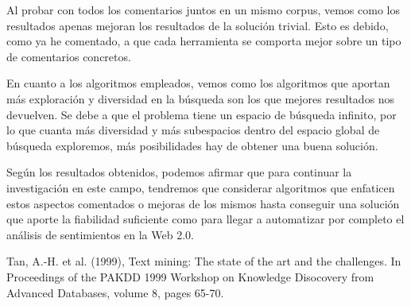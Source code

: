 \documentclass{article}
\begin{document}
Al probar con todos los comentarios juntos en un mismo corpus, vemos como los resultados apenas mejoran los resultados de la solución trivial. Esto es debido,  como ya he comentado, a que cada herramienta se comporta mejor sobre un tipo de comentarios concretos.

En cuanto a los algoritmos empleados, vemos como los algoritmos que aportan más exploración y diversidad en la búsqueda son los que mejores resultados nos devuelven. Se debe a que el problema tiene un espacio de búsqueda infinito, por lo que cuanta más diversidad y más subespacios dentro del espacio global de búsqueda exploremos, más posibilidades hay de obtener una buena solución.

Según los resultados obtenidos, podemos afirmar que para continuar la investigación en este campo, tendremos que considerar algoritmos que enfaticen estos aspectos comentados o mejoras de los mismos hasta conseguir una solución que aporte la fiabilidad suficiente como para llegar a automatizar por completo el análisis de sentimientos en la Web 2.0.
\begin{thebibliography}{99}
 \hspace{-.22cm} Tan, A.-H. et al. (1999), Text mining: The state of the art and
	the challenges. In Proceedings of the PAKDD 1999 Workshop on Knowledge
	Disocovery from Advanced Databases, volume 8, pages 65-70.
\end{thebibliography}
\end{document}

